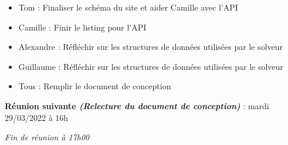 \documentclass[12pt,a4paper,final]{report}
\begin{document}
\begin{itemize}
    \item Tom : Finaliser le schéma du site et aider Camille avec l'API
    \item Camille : Finir le listing pour l'API
    \item Alexandre : Réfléchir sur les structures de données utilisées par le solveur 
    \item Guillaume : Réfléchir sur les structures de données utilisées par le solveur 
    \item Tous : Remplir le document de conception
\end{itemize}

\begin{flushleft}
    \textbf{Réunion suivante \textit{(Relecture du document de conception)}} : mardi 29/03/2022 à 16h
\end{flushleft}

\begin{flushleft}
    \textit{Fin de réunion à 17h00}
\end{flushleft}
\end{document}
